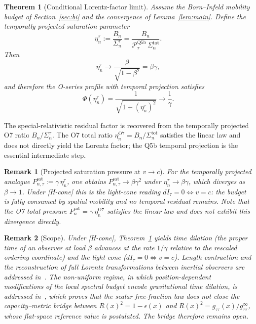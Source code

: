 \documentclass[11pt]{article}
\newtheorem{theorem}{Theorem}
\newtheorem{remark}{Remark}
\begin{document}
  \begin{theorem}[Conditional Lorentz-factor limit]
    \label{thm:lorentz}
    Assume the Born--Infeld mobility budget of Section~\ref{sec:bi} and the
    convergence of Lemma~\ref{lem:main}.
    Define the temporally projected saturation parameter
    \[
      \eta_n^\tau := \frac{B_n}{\Sigma_n^\tau}
      = \frac{B_n}{\mathcal{P}_\tau^{\mathrm{Q5b}}\,\Sigma_n^{\mathrm{tot}}}.
    \]
    Then
    \[
      \eta_n^\tau
      \longrightarrow
      \frac{\beta}{\sqrt{1-\beta^2}}
      =
      \beta\gamma,
    \]
    and therefore the O-series profile with temporal projection satisfies
    \[
      \Phi\!\left(\eta_n^\tau\right)
      =
      \frac{1}{\sqrt{1+\left(\eta_n^\tau\right)^2}}
      \longrightarrow
      \frac{1}{\gamma}.
    \]
  \end{theorem}

  The special-relativistic residual factor is recovered from the temporally
  projected O7 ratio $B_n/\Sigma_n^\tau$.
  The O7 total ratio $\eta_n^{\mathrm{O7}} = B_n/\Sigma_n^{\mathrm{tot}}$ satisfies
  the linear law and does not directly yield the Lorentz factor; the Q5b temporal
  projection is the essential intermediate step.

  \begin{remark}[Projected saturation pressure at $v \to c$]
For the temporally projected analogue $P_{n,\tau}^{\mathrm{sat}} := \gamma\,\eta_n^\tau$,
one obtains $P_{n,\tau}^{\mathrm{sat}} \to \beta\gamma^2$ under $\eta_n^\tau \to \beta\gamma$,
which diverges as $\beta \to 1$.
Under [H-cone] this is the light-cone reading $dI_\tau = 0 \Leftrightarrow v = c$:
the budget is fully consumed by spatial mobility and no temporal residual remains.
Note that the O7 total pressure $P_n^{\mathrm{sat}} = \gamma\,\eta_n^{\mathrm{O7}}$
satisfies the linear law and does not exhibit this divergence directly.
  \end{remark}

  \begin{remark}[Scope]
Under [H-cone], Theorem~\ref{thm:lorentz} yields time dilation
(the proper time of an observer at load $\beta$ advances at the rate $1/\gamma$ relative to the rescaled ordering
coordinate) and the light cone ($dI_\tau = 0 \Leftrightarrow v = c$).
Length contraction and the reconstruction of full Lorentz transformations between
inertial observers are addressed in~\cite{Beau2026lco1}.
The non-uniform regime, in which position-dependent modifications of the local
spectral budget encode gravitational time dilation, is addressed in~\cite{Beau2026lco2o1},
which proves that the scalar free-fraction law does not close the capacity--metric bridge
between $R(x)^2 = 1-\epsilon(x)$ and $R(x)^2 = g_{\tau\tau}(x)/g_{\tau\tau}^\infty$, whose flat-space reference
value is postulated.
The bridge therefore remains open.
  \end{remark}
\end{document}
